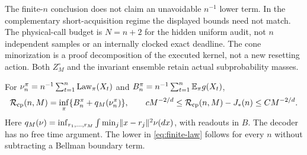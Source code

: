 The finite-$n$ conclusion does not claim an unavoidable $n^{-1}$ lower term. In the complementary short-acquisition regime the displayed bounds need not match. The physical-call budget is $N=n+2$ for the hidden uniform audit, not $n$ independent samples or an internally clocked exact deadline. The cone minorization is a proof decomposition of the executed kernel, not a new resetting action. Both $Z_M^\circ$ and the invariant ensemble retain actual subprobability masses.

\begin{corollary}\label{cor:checkpoint}
For $\nu_n^\pi=n^{-1}\sum_{t=1}^n\operatorname{Law}_\pi(X_t)$ and
$B_n^\pi=n^{-1}\sum_{t=1}^n\mathbb E_\pi g(X_t)$,
\begin{equation}\label{eq:checkpoint}
 \mathcal R_{\rm cp}(n,M)=\inf_\pi\{B_n^\pi+q_M(\nu_n^\pi)\},\qquad
 cM^{-2/d}\le\mathcal R_{\rm cp}(n,M)-J_*(n)\le CM^{-2/d}.
\end{equation}
Here $q_M(\nu)=\inf_{r_1,\ldots,r_M}\int\min_j\lVert x-r_j\rVert^2\nu(dx)$, with readouts in $B$. The decoder has no free time argument. The lower in \eqref{eq:finite-law} follows for every $n$ without subtracting a Bellman boundary term.
\end{corollary}
